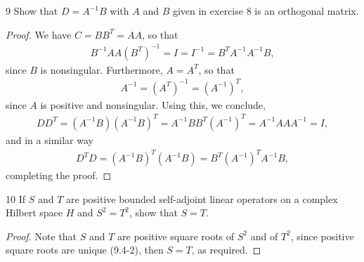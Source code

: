 \begin{exercise}{9}
Show that $D = A^{-1} B$ with $A$ and $B$ given in exercise 8 is an orthogonal matrix.
\end{exercise}
\begin{proof}
We have $C = B B^T = A A$, so that 
\begin{align*}
    B^{-1} A A (B^T)^{-1} 
    = I 
    = I^{-1} 
    = B^T A^{-1} A^{-1} B,
\end{align*}
since $B$ is nonsingular.
Furthermore, $A = A^T$, so that 
\begin{align*}
    A^{-1} 
    = (A^T)^{-1} 
    = (A^{-1})^T,
\end{align*}
since $A$ is positive and nonsingular.
Using this, we conclude,
\begin{align*}
    D D^T 
    = (A^{-1} B) (A^{-1} B)^T 
    = A^{-1} B B^T (A^{-1})^T 
    = A^{-1} A A A^{-1}
    = I,
\end{align*}
and in a similar way 
\begin{align*}
    D^T D 
    = (A^{-1} B)^T (A^{-1} B)
    = B^T (A^{-1})^T A^{-1} B,
\end{align*}
completing the proof.
\end{proof} 

\begin{exercise}{10}
If $S$ and $T$ are positive bounded self-adjoint linear operators on a complex Hilbert space $H$ and $S^2 = T^2$, show that $S = T$.
\end{exercise}
\begin{proof}
Note that $S$ and $T$ are positive square roots of $S^2$ and of $T^2$, since positive square roots are unique (9.4-2), then $S = T$, as required.
\end{proof} 
